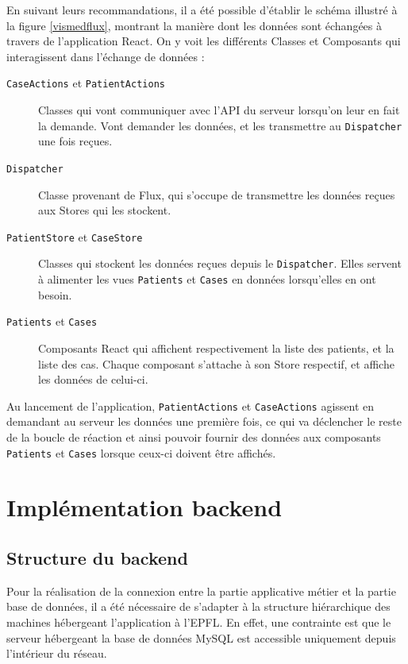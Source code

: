 			En suivant leurs recommandations, il a été possible d'établir le schéma illustré à la figure \ref{vismedflux}, montrant la manière dont les données sont échangées à travers de l'application React. On y voit les différents Classes et Composants qui interagissent dans l'échange de données :
			\begin{description}
				\item[\texttt{CaseActions} et \texttt{PatientActions}] Classes qui vont communiquer avec l'API du serveur lorsqu'on leur en fait la demande. Vont demander les données, et les transmettre au \texttt{Dispatcher} une fois reçues.
				\item[\texttt{Dispatcher}] Classe provenant de Flux, qui s'occupe de transmettre les données reçues aux Stores qui les stockent.
				\item[\texttt{PatientStore} et \texttt{CaseStore}]
				Classes qui stockent les données reçues depuis le \texttt{Dispatcher}. Elles servent à alimenter les vues \texttt{Patients} et \texttt{Cases} en données lorsqu'elles en ont besoin.
				\item[\texttt{Patients} et \texttt{Cases}] Composants React qui affichent respectivement la liste des patients, et la liste des cas. Chaque composant s'attache à son Store respectif, et affiche les données de celui-ci.
			\end{description}

			Au lancement de l'application, \texttt{PatientActions} et \texttt{CaseActions} agissent en demandant au serveur les données une première fois, ce qui va déclencher le reste de la boucle de réaction et ainsi pouvoir fournir des données aux composants \texttt{Patients} et \texttt{Cases} lorsque ceux-ci doivent être affichés.

\section{Implémentation backend}

	\subsection{Structure du backend}

		Pour la réalisation de la connexion entre la partie applicative métier et la partie base de données, il a été nécessaire de s'adapter à la structure hiérarchique des machines hébergeant l'application à l'EPFL. En effet, une contrainte est que le serveur hébergeant la base de données MySQL est accessible uniquement depuis l'intérieur du réseau.


